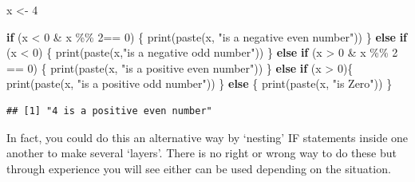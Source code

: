 \documentclass[
]{book}
\newenvironment{Shaded}{\begin{snugshade}}{\end{snugshade}}
\newcommand{\ControlFlowTok}[1]{\textcolor[rgb]{0.13,0.29,0.53}{\textbf{#1}}}
\newcommand{\DecValTok}[1]{\textcolor[rgb]{0.00,0.00,0.81}{#1}}
\newcommand{\FunctionTok}[1]{\textcolor[rgb]{0.00,0.00,0.00}{#1}}
\newcommand{\NormalTok}[1]{#1}
\newcommand{\OtherTok}[1]{\textcolor[rgb]{0.56,0.35,0.01}{#1}}
\newcommand{\SpecialCharTok}[1]{\textcolor[rgb]{0.00,0.00,0.00}{#1}}
\newcommand{\StringTok}[1]{\textcolor[rgb]{0.31,0.60,0.02}{#1}}
\theoremstyle{definition}
\theoremstyle{definition}
\theoremstyle{definition}
\theoremstyle{definition}
\theoremstyle{remark}
\begin{document}
\begin{Shaded}
\begin{Highlighting}[]
\NormalTok{x }\OtherTok{\textless{}{-}} \DecValTok{4}

\ControlFlowTok{if}\NormalTok{ (x }\SpecialCharTok{\textless{}} \DecValTok{0} \SpecialCharTok{\&}\NormalTok{ x }\SpecialCharTok{\%\%} \DecValTok{2}\SpecialCharTok{==} \DecValTok{0}\NormalTok{) \{}
    \FunctionTok{print}\NormalTok{(}\FunctionTok{paste}\NormalTok{(x, }\StringTok{"is a negative even number"}\NormalTok{))}
\NormalTok{  \} }\ControlFlowTok{else} \ControlFlowTok{if}\NormalTok{ (x }\SpecialCharTok{\textless{}} \DecValTok{0}\NormalTok{) \{ }
    \FunctionTok{print}\NormalTok{(}\FunctionTok{paste}\NormalTok{(x,}\StringTok{"is a negative odd number"}\NormalTok{))}
\NormalTok{\} }\ControlFlowTok{else} \ControlFlowTok{if}\NormalTok{ (x }\SpecialCharTok{\textgreater{}} \DecValTok{0} \SpecialCharTok{\&}\NormalTok{ x }\SpecialCharTok{\%\%} \DecValTok{2} \SpecialCharTok{==} \DecValTok{0}\NormalTok{) \{}
    \FunctionTok{print}\NormalTok{(}\FunctionTok{paste}\NormalTok{(x, }\StringTok{"is a positive even number"}\NormalTok{))}
\NormalTok{  \} }\ControlFlowTok{else} \ControlFlowTok{if}\NormalTok{ (x }\SpecialCharTok{\textgreater{}} \DecValTok{0}\NormalTok{)\{}
    \FunctionTok{print}\NormalTok{(}\FunctionTok{paste}\NormalTok{(x, }\StringTok{"is a positive odd number"}\NormalTok{))}
\NormalTok{\} }\ControlFlowTok{else}\NormalTok{ \{}
  \FunctionTok{print}\NormalTok{(}\FunctionTok{paste}\NormalTok{(x, }\StringTok{"is Zero"}\NormalTok{))}
\NormalTok{\}}
\end{Highlighting}
\end{Shaded}

\begin{verbatim}
## [1] "4 is a positive even number"
\end{verbatim}

In fact, you could do this an alternative way by `nesting' IF statements inside one another to make several `layers'. There is no right or wrong way to do these but through experience you will see either can be used depending on the situation.
\end{document}
